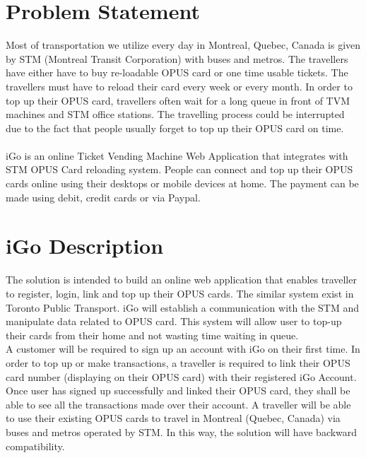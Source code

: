 \documentclass[11pt, english]{report}
\begin{document}
\section{Problem Statement}
Most of transportation we utilize every day in Montreal, Quebec, Canada is given by STM (Montreal Transit Corporation) with buses and metros. The travellers have either have to buy re-loadable OPUS card or one time usable tickets. The travellers must have to reload their card every week or every month. In order to top up their OPUS card, travellers often wait for a long queue in front of \gls{TVM} machines and STM office stations. The travelling process could be interrupted due to the fact that people usually forget to top up their OPUS card on time. \\ \\

iGo is an online Ticket Vending Machine Web Application that integrates with STM OPUS Card reloading system. People can connect and top up their OPUS cards online using their desktops or mobile devices at home. The payment can be made using debit, credit cards or via Paypal.

\section{iGo Description}
The solution is intended to build an online web application that enables \gls{traveller} to register, login, link and top up their OPUS cards. The similar system exist in Toronto Public Transport. iGo will establish a communication with the STM and manipulate data related to OPUS card. This system will allow user to top-up their cards from their home and not wasting time waiting in queue. \\

A customer will be required to sign up an account with iGo on their first time. In order to top up or make transactions, a traveller is required to link their OPUS card number (displaying on their OPUS card)  with their registered iGo Account. Once user has signed up successfully and linked their OPUS card, they shall be able to see all the transactions made over their account. A traveller will be able to use their existing OPUS cards to travel in Montreal (Quebec, Canada) via buses and metros operated by STM. In this way, the solution will have backward compatibility.\\
\end{document}
